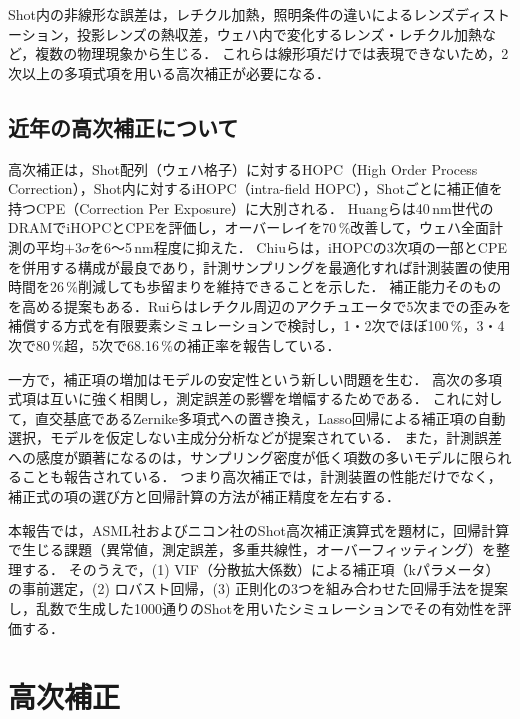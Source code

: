 \documentclass[11pt,a4paper]{ltjsarticle}
\begin{document}
Shot内の非線形な誤差は，レチクル加熱\cite{Lim2014}，照明条件の違いによるレンズディストーション\cite{Pike2015}，投影レンズの熱収差\cite{Matsuyama2015,Ishiyama2016}，ウェハ内で変化するレンズ・レチクル加熱\cite{Chen2018}など，複数の物理現象から生じる．
これらは線形項だけでは表現できないため，2次以上の多項式項を用いる高次補正が必要になる．

\subsection{近年の高次補正について}

高次補正は，Shot配列（ウェハ格子）に対するHOPC（High Order Process Correction），Shot内に対するiHOPC（intra-field HOPC），Shotごとに補正値を持つCPE（Correction Per Exposure）に大別される．
Huangらは40\,nm世代のDRAMでiHOPCとCPEを評価し，オーバーレイを70\,\%改善して，ウェハ全面計測の平均$+3\sigma$を6〜5\,nm程度に抑えた\cite{Huang2009}．
Chiuらは，iHOPCの3次項の一部とCPEを併用する構成が最良であり，計測サンプリングを最適化すれば計測装置の使用時間を26\,\%削減しても歩留まりを維持できることを示した\cite{Chiu2012}．
補正能力そのものを高める提案もある．Ruiらはレチクル周辺のアクチュエータで5次までの歪みを補償する方式を有限要素シミュレーションで検討し，1・2次でほぼ100\,\%，3・4次で80\,\%超，5次で68.16\,\%の補正率を報告している\cite{Rui2025}．

一方で，補正項の増加はモデルの安定性という新しい問題を生む．
高次の多項式項は互いに強く相関し，測定誤差の影響を増幅するためである\cite{Ullah2013}．
これに対して，直交基底であるZernike多項式への置き換え\cite{Ju2016}，Lasso回帰による補正項の自動選択\cite{Ehrlich2025,Ehrlich2026}，モデルを仮定しない主成分分析\cite{Mohammad2026}などが提案されている．
また，計測誤差への感度が顕著になるのは，サンプリング密度が低く項数の多いモデルに限られることも報告されている\cite{Klein2026}．
つまり高次補正では，計測装置の性能だけでなく，補正式の項の選び方と回帰計算の方法が補正精度を左右する．

本報告では，ASML社およびニコン社のShot高次補正演算式を題材に，回帰計算で生じる課題（異常値，測定誤差，多重共線性，オーバーフィッティング）を整理する．
そのうえで，(1) VIF（分散拡大係数）による補正項（kパラメータ）の事前選定，(2) ロバスト回帰，(3) 正則化の3つを組み合わせた回帰手法を提案し，乱数で生成した1000通りのShotを用いたシミュレーションでその有効性を評価する．

\section{高次補正}
\end{document}
